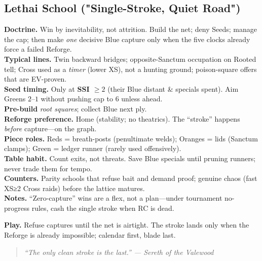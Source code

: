 \documentclass[11pt]{article}
\providecommand{\playdesc}[1]{\par\smallskip\noindent\small\textbf{Play.} #1\par}
\newcommand{\flavline}[2]{\noindent\textbf{#1.} \textit{#2}\par}
\begin{document}
\subsection*{Lethai School ("Single-Stroke, Quiet Road")}
\textbf{Doctrine.} Win by inevitability, not attrition. Build the net; deny Seeds; manage the cap; then make \emph{one} decisive Blue capture only when the five clocks already force a failed Reforge. \\
\textbf{Typical lines.} Twin backward bridges; opposite-Sanctum occupation on Rooted tell; Cross used as a \emph{timer} (lower XS), not a hunting ground; poison-square offers that are EV-proven. \\
\textbf{Seed timing.} Only at \textbf{SSI $\ge 2$} (their Blue distant \& specials spent). Aim Greens $2$–$1$ without pushing cap to $6$ unless ahead. \\
\textbf{Pre-build} \emph{root squares}; collect Blue next ply. \\
\textbf{Reforge preference.} Home (stability; no theatrics). The “stroke” happens \emph{before} capture—on the graph. \\
\textbf{Piece roles.} Reds = breath-posts (penultimate welds); Oranges = lids (Sanctum clamps); Green = ledger runner (rarely used offensively). \\
\textbf{Table habit.} Count exits, not threats. Save Blue specials until pruning runners; never trade them for tempo. \\
\textbf{Counters.} Parity schools that refuse bait and demand proof; genuine chaos (fast XS≥2 Cross raids) before the lattice matures. \\
\textbf{Notes.} “Zero-capture” wins are a flex, not a plan—under tournament no-progress rules, cash the single stroke when RC is dead.
\playdesc{Refuse captures until the net is airtight. The stroke lands only when the Reforge is already impossible; calendar first, blade last.}
\providecommand{\flavline}[2]{\noindent\textbf{#1.} \textit{#2}\par}
\begin{quote}\small\itshape
“The only clean stroke is the last.” — Sereth of the Valewood
\end{quote}
\end{document}
